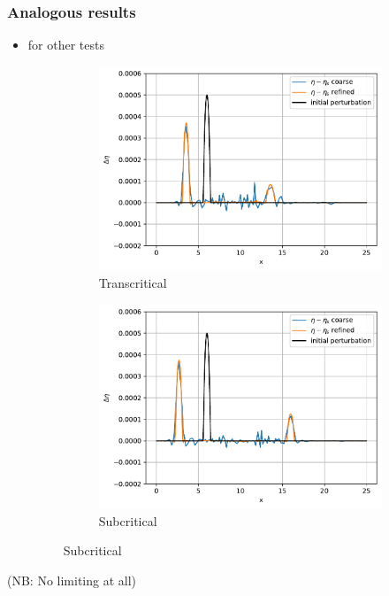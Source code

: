 \documentclass[pt12]{beamer}
\begin{document}
\begin{frame}
\frametitle{Analogous results}

\begin{itemize}
\item for other tests 
\begin{figure}
     \centering
     \begin{subfigure}[b]{0.4\textwidth}
         \centering
         \includegraphics[width=\textwidth]{alb_trans_WBp2s14jr.pdf}
         \caption{Transcritical}
     \end{subfigure}
     \begin{subfigure}[b]{0.4\textwidth}
         \centering
         \includegraphics[width=\textwidth]{alb_sub_WBp2s14jr.pdf}
         \caption{Subcritical}
     \end{subfigure}
\end{figure}

\end{itemize}





\centering
(NB: No limiting at all)

\end{frame}
\end{document}

